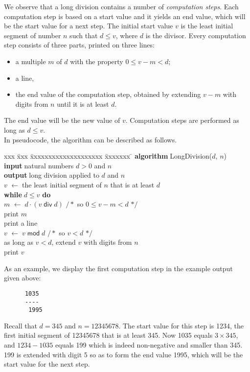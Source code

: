 \documentclass[a4paper]{article}
\renewcommand{\div}{\;\mathsf{div}\;}
\newcommand{\Algorithm}{\textbf{\textsf{algorithm}}$\;$}
\newcommand{\Do}{\textbf{\textsf{do}}$\;$}
\newcommand{\Input}{\textbf{\textsf{input}}$\;$}
\newcommand{\Output}{\textbf{\textsf{output}}$\;$}
\newcommand{\While}{\textbf{\textsf{while}}$\;$}
\newcommand{\becomes}{$\leftarrow\;$}
\newcommand{\Comment}[1]{$/*$#1$*/$}
\newcommand{\mod}{\;\mathsf{mod}\;}
\begin{document}
We observe that a long division contains a number of \textit{computation steps}.
Each computation step is based on a start value and it yields an end value, which will be the start value for a next step.
The initial start value $v$ is the least initial segment of number $n$ such that $d \leq v$, where $d$ is the divisor.
Every computation step consists of three parts, printed on three lines:
\begin{itemize}
\item a multiple $m$ of $d$ with the property $0 \leq v - m < d$;
\item a line,
\item the end value of the computation step, obtained by extending $v - m$ with digits from $n$ until it is at least $d$.
\end{itemize}
The end value will be the new value of $v$.
Computation steps are performed as long as $d \leq v$. 
\\[2ex]
In pseudocode, the algorithm can be described as follows.
\begin{tabbing}
xxx \= xxx \= xxxxxxxxxxxxxxxxxxxx \= xxxxxxx \= \kill
\Algorithm LongDivision($d$, $n$) \\
\> \Input natural numbers $d > 0$ and $n$ \\
\> \Output long division applied to $d$ and $n$\\
\> $v$ \becomes the least initial segment of $n$ that is at least $d$ \\
\> \While $d \leq v$ \Do \\
\> \> $m$ \becomes $d \cdot (v \div d)$ \> \Comment{ so $0 \leq v - m < d$ } \\
\> \> print $m$ \\
\> \> print a line \\
\> \> $v$ \becomes $v \mod d$ \> \Comment{ so $v < d$ } \\
\> \> as long as $v < d$, extend $v$ with digits from $n$ \\
\> \> print $v$
\end{tabbing} 
As an example, we display the first computation step in the example output given above:
\begin{verbatim}
      1035
      ----
       1995
\end{verbatim}
Recall that $d = 345$ and $n = 12345678$.
The start value for this step is 1234, the first initial segment of 12345678 that is at least 345.
Now 1035 equals $3 \times 345$, and $1234 - 1035$ equals 199 which is indeed non-negative and smaller than 345.
199 is extended with digit 5 so as to form the end value 1995, which will be the start value for the next step.
\end{document}
